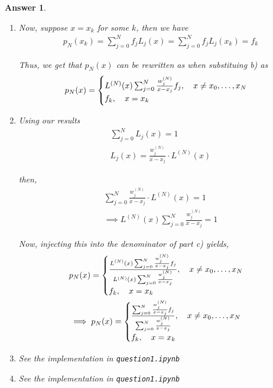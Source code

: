 \documentclass[12pt]{article}
\theoremstyle{colon}
\newtheorem*{answer}{Answer}
\begin{document}
\begin{answer}
\begin{enumerate}[label=\alph*)]
    \item Now, suppose $x = x_k$ for some $k$, then we have
      \begin{gather*}
        p_N(x_k) = \sum_{j=0}^N f_j L_j(x) = \sum_{j=0}^N f_j L_j(x_k) = f_k
      \end{gather*}

      Thus, we get that $p_N(x)$ can be rewritten as when substituing b) as
      \begin{gather*}
        p_N(x) = \begin{cases}
          L^{(N)}(x) \sum_{j=0}^N \frac{w_j^{(N)}}{x-x_j} f_j, \quad x \neq x_0, \mathellipsis, x_N \\
          f_k, \quad x = x_k
        \end{cases}
      \end{gather*}

    \item Using our results
      \begin{gather*}
        \sum_{j=0}^N L_j(x) = 1 \\
        L_j(x) = \frac{w_j^{(N)}}{x-x_j} \cdot L^{(N)}(x)
      \end{gather*}

      then,
      \begin{gather*}
        \sum_{j=0}^N \frac{w_j^{(N)}}{x-x_j} \cdot L^{(N)}(x) = 1 \\
        \implies L^{(N)}(x) \sum_{j=0}^N \frac{w_j^{(N)}}{x-x_j} = 1
      \end{gather*}

      Now, injecting this into the denominator of part c) yields,
      \begin{gather*}
        p_N(x) = \begin{cases}
          \frac{L^{(N)}(x) \sum_{j=0}^N \frac{w_j^{(N)}}{x-x_j} f_j}{L^{(N)}(x) \sum_{j=0}^N \frac{w_j^{(N)}}{x-x_j}}, \quad x \neq x_0, \mathellipsis, x_N \\
          f_k, \quad x = x_k
        \end{cases} \\
        \implies p_N(x) = \begin{cases}
          \frac{\sum_{j=0}^N \frac{w_j^{(N)}}{x-x_j} f_j}{\sum_{j=0}^N \frac{w_j^{(N)}}{x-x_j}}, \quad x \neq x_0, \mathellipsis, x_N \\
          f_k, \quad x = x_k
        \end{cases}
      \end{gather*}

    \item See the implementation in \texttt{question1.ipynb}

    \item See the implementation in \texttt{question1.ipynb}

  \end{enumerate}
\end{answer}
\end{document}
